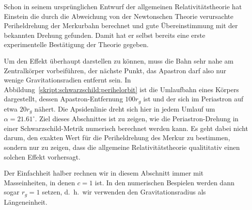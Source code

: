 Schon in seinem ursprünglichen Entwurf der allgemeinen Relativitätstheorie
hat Einstein die durch die Abweichung von der Newtonschen Theorie
verursachte Periheldrehung der Merkurbahn berechnet und gute Übereinstimmung
mit der bekannten Drehung gefunden.
Damit hat er selbst bereits eine erste experimentelle Bestätigung
der Theorie gegeben.

Um den Effekt überhaupt darstellen zu können, muss die Bahn sehr nahe
am Zentralkörper vorbeiführen, der nächste Punkt, das Apastron darf
also nur wenige Gravitationsradien entfernt sein.
In Abbildung~\ref{skript:schwarzschild:perihelorbit} ist die
Umlaufbahn eines Körpers dargestellt, dessen Apastron-Entfernung
$100 r_g$ ist und der sich im Periastron auf etwa $20r_g$ 
nähert.
Die Apsidenlinie dreht sich hier in jedem Umlauf um $\alpha = 21.61^\circ$.
Ziel dieses Abschnittes ist zu zeigen, wie die Periastron-Drehung
in einer Schwarzschild-Metrik numerisch berechnet werden kann.
Es geht dabei nicht darum, den exakten Wert für die Periheldrehung
des Merkur zu bestimmen,
sondern nur zu zeigen, dass die allgemeine Relativitätstheorie
qualititativ einen solchen Effekt vorhersagt.

Der Einfachheit halber rechnen wir in diesem Abschnitt immer mit
Masseinheiten, in denen $c=1$ ist.
In den numerischen Bespielen werden dann sogar $r_g=1$ setzen,
d.~h.~wir verwenden den Gravitationsradius als Längeneinheit.

